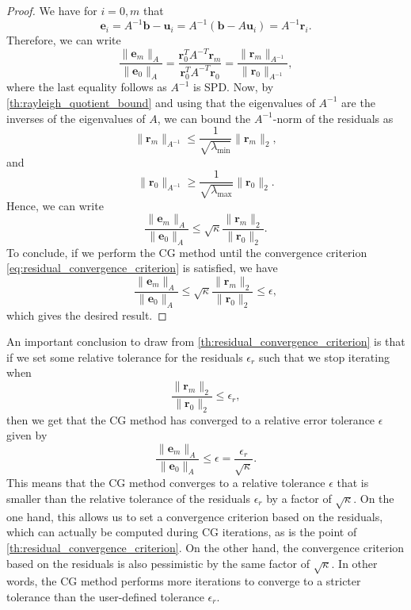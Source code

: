 \begin{proof}
  We have for $i=0,m$ that
  \[
    \mathbf{e}_i = A^{-1}\mathbf{b} - \mathbf{u}_i = A^{-1}(\mathbf{b} - A\mathbf{u}_i) = A^{-1}\mathbf{r}_i.
  \]
  Therefore, we can write
  \[
    \frac{\|\mathbf{e}_m\|_A}{\|\mathbf{e}_0\|_A} = \frac{\mathbf{r}_0^TA^{-T}\mathbf{r}_m}{\mathbf{r}_0^TA^{-T}\mathbf{r}_0} = \frac{\|\mathbf{r}_m\|_{A^{-1}}}{\|\mathbf{r}_0\|_{A^{-1}}},
  \]
  where the last equality follows as $A^{-1}$ is SPD. Now, by \cref{th:rayleigh_quotient_bound} and using that the eigenvalues of $A^{-1}$ are the inverses of the eigenvalues of $A$, we can bound the $A^{-1}$-norm of the residuals as
  \[
    \|\mathbf{r}_m\|_{A^{-1}}  \leq \frac{1}{\sqrt{\lambda_{\text{min}}}} \|\mathbf{r}_m\|_2,
  \]
  and
  \[
    \|\mathbf{r}_0\|_{A^{-1}} \geq \frac{1}{\sqrt{\lambda_{\text{max}}}} \|\mathbf{r}_0\|_2.
  \]
  Hence, we can write
  \[
    \frac{\|\mathbf{e}_m\|_A}{\|\mathbf{e}_0\|_A} \leq \sqrt{\kappa} \frac{\|\mathbf{r}_m\|_2}{\|\mathbf{r}_0\|_2}.
  \]
  To conclude, if we perform the CG method until the convergence criterion \cref{eq:residual_convergence_criterion} is satisfied, we have
  \[
    \frac{\|\mathbf{e}_m\|_A}{\|\mathbf{e}_0\|_A} \leq \sqrt{\kappa} \frac{\|\mathbf{r}_m\|_2}{\|\mathbf{r}_0\|_2} \leq \epsilon,
  \]
  which gives the desired result.
\end{proof}
An important conclusion to draw from \cref{th:residual_convergence_criterion} is that if we set some relative tolerance for the residuals $\epsilon_r$ such that we stop iterating when
\begin{equation}
  \frac{\|\mathbf{r}_m\|_2}{\|\mathbf{r}_0\|_2} \leq \epsilon_r,
  \label{eq:residual_convergence_criterion_r}
\end{equation}
then we get that the CG method has converged to a relative error tolerance $\epsilon$ given by
\[
  \frac{\|\mathbf{e}_m\|_A}{\|\mathbf{e}_0\|_A} \leq \epsilon = \frac{\epsilon_r}{\sqrt{\kappa}}.
\]
This means that the CG method converges to a relative tolerance $\epsilon$ that is smaller than the relative tolerance of the residuals $\epsilon_r$ by a factor of $\sqrt{\kappa}$. On the one hand, this allows us to set a convergence criterion based on the residuals, which can actually be computed during CG iterations, as is the point of \cref{th:residual_convergence_criterion}. On the other hand, the convergence criterion based on the residuals is also pessimistic by the same factor of $\sqrt{\kappa}$. In other words, the CG method performs more iterations to converge to a stricter tolerance than the user-defined tolerance $\epsilon_r$.


